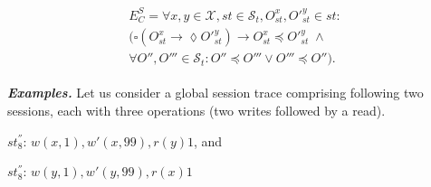 \documentclass[conference]{IEEEtran}
\begin{document}
	\begin{align}\label{eqn:SC}
	\begin{split}
	E^S_C =  %
	\forall x,y \in \mathcal{X}, \mathit{st} \in \mathcal{S}_t, O_\mathit{st}^x, O'^{y}_\mathit{st} \in \mathit{st}:  \\
	\big( \square \left( O_\mathit{st}^x \rightarrow \lozenge O'^{y}_\mathit{st} \right)
	\rightarrow O_\mathit{st}^x \preccurlyeq O'^{y}_\mathit{st}  \; \wedge
	\\
	\forall O'', O''' \in \mathcal{S}_t:
	O'' \preccurlyeq O''' \vee O''' \preccurlyeq O'' \big). %
	\end{split}
	\end{align}
	
	\noindent \emph{\textbf{Examples.}}
	Let us consider a global session trace comprising following two sessions, each with three operations (two writes followed by a read).
	
	$\mathit{st}_8^{''}$:   $w(x, 1), w'(x,99), r(y){1}$, and
	
	$\mathit{st}_8^{''}$:  $w(y, 1), w'(y,99), r(x){1}$
	
\end{document}
